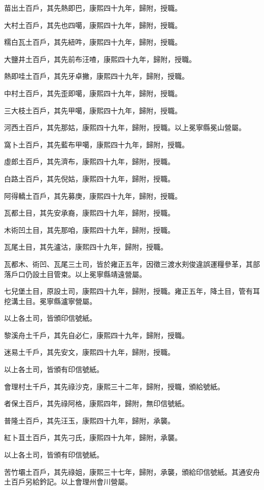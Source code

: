 \begin{pinyinscope}
苗出土百戶，其先熱即巴，康熙四十九年，歸附，授職。

大村土百戶，其先也四噶，康熙四十九年，歸附，授職。

糯白瓦土百戶，其先紐吽，康熙四十九年，歸附，授職。

大鹽井土百戶，其先前布汪喳，康熙四十九年，歸附，授職。

熱即哇土百戶，其先牙卓撇，康熙四十九年，歸附，授職。

中村土百戶，其先歪即噶，康熙四十九年，歸附，授職。

三大枝土百戶，其先甲噶，康熙四十九年，歸附，授職。

河西土百戶，其先那姑，康熙四十九年，歸附，授職。以上冕寧縣冕山營屬。

窩卜土百戶，其先藍布甲噶，康熙四十九年，歸附，授職。

虛郎土百戶，其先濟布，康熙四十九年，歸附，授職。

白路土百戶，其先倪姑，康熙四十九年，歸附，授職。

阿得轎土百戶，其先募庚，康熙四十九年，歸附，授職。

瓦都土目，其先安承裔，康熙四十九年，歸附，授職。

木術凹土目，其先那咱，康熙四十九年，歸附，授職。

瓦尾土目，其先瀘沽，康熙四十九年，歸附，授職。

瓦都木、術凹、瓦尾三土司，皆於雍正五年，因徵三渡水刾俊違誤運糧參革，其部落戶口仍設土目管束。以上冕寧縣靖遠營屬。

七兒堡土目，原設土司，康熙四十九年，歸附，授職。雍正五年，降土目，管有耳挖溝土目。冕寧縣瀘寧營屬。

以上各土司，皆頒印信號紙。

黎溪舟土千戶，其先自必仁，康熙四十九年，歸附，授職。

迷易土千戶，其先安文，康熙四十九年，歸附，授職。

以上各土司，皆頒有印信號紙。

會理村土千戶，其先祿沙克，康熙三十二年，歸附，授職，頒給號紙。

者保土百戶，其先祿阿格，康熙四年，歸附，無印信號紙。

普隆土百戶，其先汪玉，康熙四十九年，歸附，承襲。

紅卜苴土百戶，其先刁氏，康熙四十九年，歸附，承襲。

以上各土司，皆頒有印信號紙。

苦竹壩土百戶，其先祿姐，康熙三十七年，歸附，承襲，頒給印信號紙。其通安舟土百戶另給鈐記。以上會理州會川營屬。


\end{pinyinscope}
